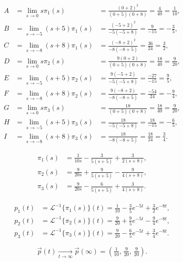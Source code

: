 \[
	\begin{aligned}
		A & = \lim_{s\rightarrow 0} s\pi_1(s)      & = \frac{(0+2)^2}{(0+5)(0+8)} = \frac{4}{40} = \frac{1}{10}, \\
		B & = \lim_{s\rightarrow -5} (s+5)\pi_1(s) & = \frac{(-5+2)^2}{-5(-5+8)} = \frac{9}{-15} = -\frac{3}{5}, \\
		C & = \lim_{s\rightarrow -8} (s+8)\pi_1(s) & = \frac{(-8+2)^2}{-8(-8+5)} = \frac{36}{24} = \frac{3}{2},  \\
		D & = \lim_{s\rightarrow 0} s\pi_2(s)      & = \frac{9(0+2)}{(0+5)(0+8)} = \frac{18}{40} = \frac{9}{20}, \\
		E & = \lim_{s\rightarrow -5} (s+5)\pi_2(s) & = \frac{9(-5+2)}{-5(-5+8)} = \frac{-27}{-15} = \frac{9}{5}, \\
		F & = \lim_{s\rightarrow -8} (s+8)\pi_2(s) & = \frac{9(-8+2)}{-8(-8+5)} = \frac{-54}{24} = -\frac{9}{4}, \\
		G & = \lim_{s\rightarrow 0} s\pi_3(s)      & = \frac{18}{(0+5)(0+8)} = \frac{18}{40} = \frac{9}{20},     \\
		H & = \lim_{s\rightarrow -5} (s+5)\pi_3(s) & = \frac{18}{-5(-5+8)} = \frac{18}{-15} = -\frac{6}{5},      \\
		I & = \lim_{s\rightarrow -8} (s+8)\pi_3(s) & = \frac{18}{-8(-8+5)} = \frac{18}{24} = \frac{3}{4}.
	\end{aligned}
\]

\[
	\begin{aligned}
		\pi_1(s) & = \frac{1}{10s} - \frac{3}{5(s+5)} + \frac{3}{2(s+8)}, \\
		\pi_2(s) & = \frac{9}{20s} + \frac{9}{5(s+5)} - \frac{9}{4(s+8)}, \\
		\pi_3(s) & = \frac{9}{20s} - \frac{6}{5(s+5)} + \frac{3}{4(s+8)}.
	\end{aligned}
\]

\[
	\begin{aligned}
		p_1(t) & = \mathcal{L}^{-1}\{\pi_1(s)\}(t)
		= \frac{1}{10} - \frac{3}{5}e^{-5t} + \frac{3}{2}e^{-8t}, \\
		p_2(t) & = \mathcal{L}^{-1}\{\pi_2(s)\}(t)
		= \frac{9}{20} + \frac{9}{5}e^{-5t} - \frac{9}{4}e^{-8t}, \\
		p_3(t) & = \mathcal{L}^{-1}\{\pi_3(s)\}(t)
		= \frac{9}{20} - \frac{6}{5}e^{-5t} + \frac{3}{4}e^{-8t}.
	\end{aligned}
\]

\[
	\vec{p}(t)\xrightarrow [t\to\infty]{}\vec{p}(\infty)=\left(\tfrac{1}{10},\,\tfrac{9}{20},\,\tfrac{9}{20}\right).
\]
